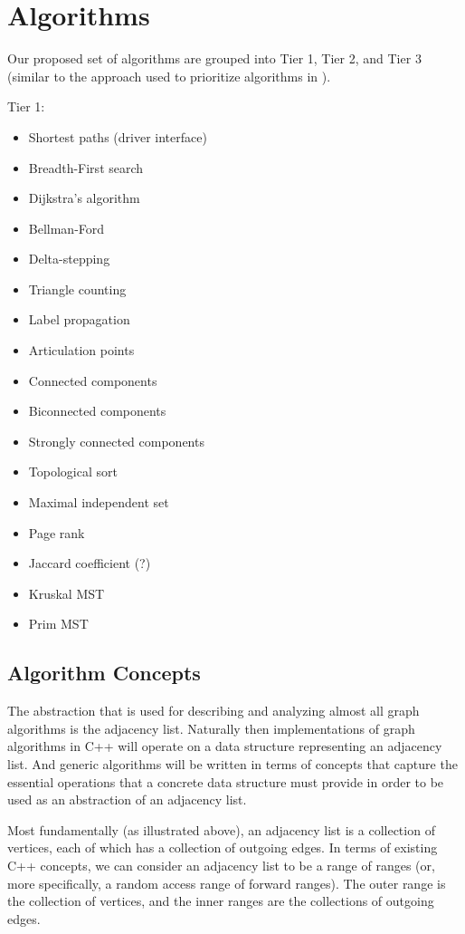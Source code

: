 \chapter{Algorithms}

Our proposed set of algorithms are grouped into Tier 1, Tier 2, and Tier 3 (similar to the approach used to prioritize algorithms in ).

Tier 1:
\begin{itemize}
\item Shortest paths (driver interface)
\item Breadth-First search
\item Dijkstra's algorithm
\item Bellman-Ford
\item Delta-stepping
\item Triangle counting
\item Label propagation
\item Articulation points
\item Connected components
\item Biconnected components
\item Strongly connected components  
\item Topological sort
\item Maximal independent set
\item Page rank
\item Jaccard coefficient (?)
\item Kruskal MST
\item Prim MST
\end{itemize}


\section{Algorithm Concepts}


The abstraction that is used for describing and analyzing almost all graph algorithms is the adjacency list.  Naturally then implementations of graph algorithms in C++ will operate on a data structure representing an adjacency list.  And generic algorithms will be written in terms of concepts that capture the essential operations that a concrete data structure must provide in order to be used as an abstraction of an adjacency list.

Most fundamentally (as illustrated above), an adjacency list is a collection of vertices, each of which has a collection of outgoing edges.  In terms of existing C++ concepts, we can consider an adjacency list to be a range of ranges (or, more specifically, a random access range of forward ranges).  The outer range is the collection of vertices, and the inner ranges are the collections of outgoing edges.

